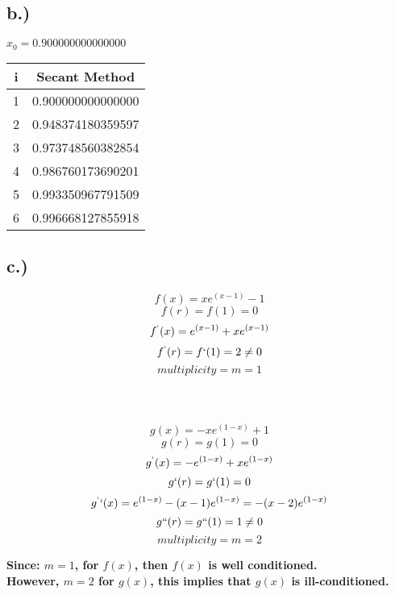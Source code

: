 \documentclass{article}
\begin{document}
\subsection*{b.)}
\textbf{$x_0 = 0.900000000000000$}
\begin{center}
    \begin{tabular}{||c c||} 
    \hline
    \textbf{i} & \textbf{Secant Method} \\ [0.5ex] 
    \hline\hline
    1 & 0.900000000000000 \\ [1ex] 
    \hline
    2 & 0.948374180359597 \\ [1ex] 
    \hline
    3 & 0.973748560382854 \\ [1ex] 
    \hline
    4 & 0.986760173690201 \\ [1ex] 
    \hline
    5 & 0.993350967791509 \\ [1ex] 
    \hline
    6 & 0.996668127855918 \\ [1ex] 
    \hline
    \end{tabular}
\end{center}
\pagebreak
\subsection*{c.)}

\[f(x) = xe^{(x-1)} - 1\] \[ f(r) = f(1) = 0\]
\[f^`(x) = e^{(x-1)} + xe^{(x-1)}\] \[f^`(r) = f`(1) = 2 \ne 0\]
\[multiplicity = m = 1 \]\\ \\ \\

\[g(x) = -xe^{(1-x)} + 1\] \[ g(r) = g(1) = 0\]
\[g^`(x) = -e^{(1-x)} + xe^{(1-x)}\] \[ g`(r) = g`(1) = 0\]
\[g^``(x) = e^{(1-x)} -(x-1)e^{(1-x)} = -(x-2)e^{(1-x)}\] \[g``(r) = g``(1) = 1 \ne 0\]
\[multiplicity = m = 2\]


\textbf{Since: $m = 1$, for $f(x)$, then $f(x)$ is well conditioned.\\ However, $m = 2$ for $g(x)$, this implies that $g(x)$ is ill-conditioned.}
\end{document}
